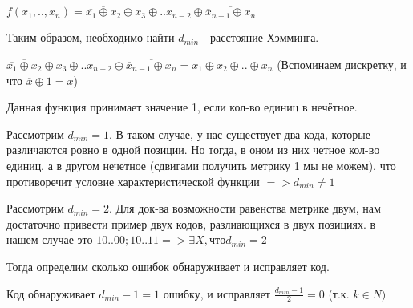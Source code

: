 \documentclass[../main.tex]{subfiles}
\begin{document}
\setlength{\parskip}{0em}

$f(x_1, .., x_n) = \overline{\overline{x_1} \oplus x_2} \oplus x_3 \oplus .. x_{n-2} \oplus \overline{\overline{x}_{n-1} \oplus x_{n}}$

Таким образом, необходимо найти $d_{min}$ - расстояние Хэмминга. 

$\overline{\overline{x_1} \oplus x_2} \oplus x_3 \oplus .. x_{n-2} \oplus \overline{\overline{x}_{n-1} \oplus x_{n}} = x_1\oplus x_2 \oplus .. \oplus x_n$ (Вспоминаем дискретку, и что $\overline{x} \oplus 1 = x$)

Данная функция принимает значение 1, если кол-во единиц в нечётное.

Рассмотрим $d_{min}=1$. В таком случае, у нас существует два кода, которые различаются ровно в одной позиции. Но тогда, в оном из них четное кол-во единиц, а в другом нечетное (сдвигами получить метрику 1 мы не можем), что противоречит условие характеристической функции $=> d_{min} \neq 1$

Рассмотрим $d_{min}=2$. Для док-ва возможности равенства метрике двум, нам достаточно привести пример двух кодов, разлиающихся в двух позициях. в нашем случае это $10..00; 10..11 => \exists X, что d_{min} =2$

Тогда определим сколько ошибок обнаруживает и исправляет код.

Код обнаруживает $d_{min} - 1 = 1$ ошибку, и исправляет $\frac{d_{min} -1}{2} =0$ (т.к. $ k \in N)$
\end{document}

